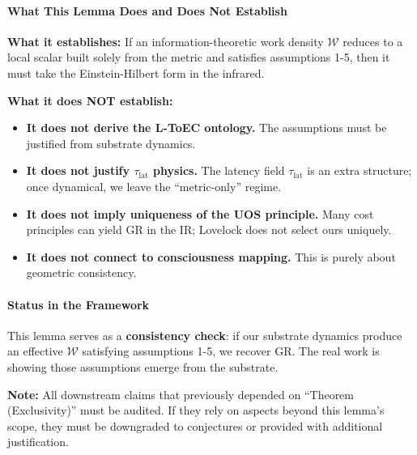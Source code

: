 \paragraph{What This Lemma Does and Does Not Establish}
\begin{tcolorbox}[colback=yellow!5!white,colframe=yellow!75!black,title=Scope and Limitations]
\textbf{What it establishes:} If an information-theoretic work density $\mathcal{W}$ reduces to a local scalar built solely from the metric and satisfies assumptions 1-5, then it must take the Einstein-Hilbert form in the infrared.

\textbf{What it does NOT establish:}
\begin{itemize}
    \item \textbf{It does not derive the L-ToEC ontology.} The assumptions must be justified from substrate dynamics.
    \item \textbf{It does not justify $\tau_{\mathrm{lat}}$ physics.} The latency field $\tau_{\mathrm{lat}}$ is an extra structure; once dynamical, we leave the ``metric-only'' regime.
    \item \textbf{It does not imply uniqueness of the UOS principle.} Many cost principles can yield GR in the IR; Lovelock does not select ours uniquely.
    \item \textbf{It does not connect to consciousness mapping.} This is purely about geometric consistency.
\end{itemize}
\end{tcolorbox}

\paragraph{Status in the Framework}
This lemma serves as a \textbf{consistency check}: if our substrate dynamics produce an effective $\mathcal{W}$ satisfying assumptions 1-5, we recover GR. The real work is showing those assumptions emerge from the substrate.

\textbf{Note:} All downstream claims that previously depended on ``Theorem (Exclusivity)'' must be audited. If they rely on aspects beyond this lemma's scope, they must be downgraded to conjectures or provided with additional justification.

